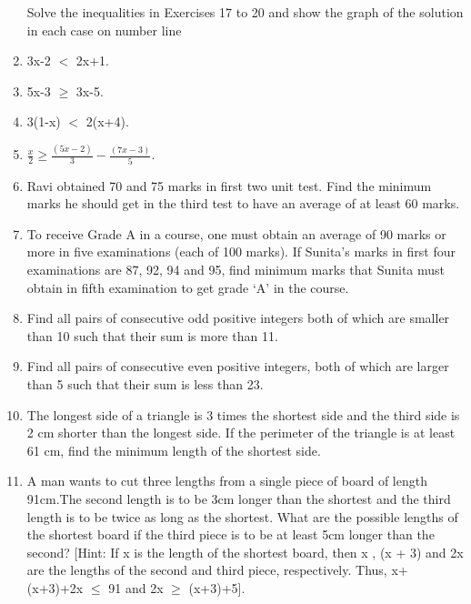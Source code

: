 \begin{enumerate}[label=\arabic*.,ref=\thesubsection.\theenumi]
Solve the inequalities in Exercises 17 to 20 and show the graph of the solution in each case on number line\\
    \item 3x-2 $<$ 2x+1.\\
    \item 5x-3 $\geq$ 3x-5.\\
    \item 3(1-x) $<$ 2(x+4).\\
    \item $\frac{x}{2}\geq\frac{(5x-2)}{3}-\frac{(7x-3)}{5}$.\\
    \item Ravi obtained 70 and 75 marks in first two unit test. Find the minimum marks he should get in the third test to have an average of at least 60 marks.\\
    \item To receive Grade A in a course, one must obtain an average of 90 marks or more in five examinations (each of 100 marks). If Sunita’s marks in first four examinations are 87, 92, 94 and 95, find minimum marks that Sunita must obtain in fifth examination to get grade ‘A’ in the course.\\
    \item Find all pairs of consecutive odd positive integers both of which are smaller than 10 such that their sum is more than 11.\\
    \item Find all pairs of consecutive even positive integers, both of which are larger than 5 such that their sum is less than 23.\\
    \item The longest side of a triangle is 3 times the shortest side and the third side is 2 cm shorter than the longest side. If the perimeter of the triangle is at least 61 cm, find the minimum length of the shortest side.\\
    \item A man wants to cut three lengths from a single piece of board of length 91cm.The second length is to be 3cm longer than the shortest and the third length is to be twice as long as the shortest. What are the possible lengths of the shortest board if the third piece is to be at least 5cm longer than the second?
[Hint: If x is the length of the shortest board, then x , (x + 3) and 2x are the
lengths of the second and third piece, respectively. Thus, x+(x+3)+2x $\leq$ 91 and 2x $\geq$ (x+3)+5].\\


\end{enumerate}
